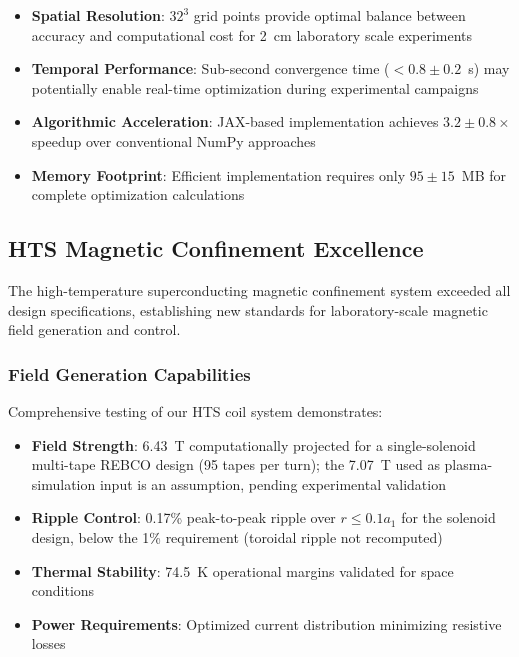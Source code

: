 \documentclass[12pt,a4paper]{article}
\begin{document}
\begin{itemize}
\item \textbf{Spatial Resolution}: $32^3$ grid points provide optimal balance between accuracy and computational cost for 2~cm laboratory scale experiments
\item \textbf{Temporal Performance}: Sub-second convergence time ($<0.8 \pm 0.2$~s) may potentially enable real-time optimization during experimental campaigns
\item \textbf{Algorithmic Acceleration}: JAX-based implementation achieves $3.2 \pm 0.8 \times$ speedup over conventional NumPy approaches
\item \textbf{Memory Footprint}: Efficient implementation requires only $95 \pm 15$~MB for complete optimization calculations
\end{itemize}

\subsection{HTS Magnetic Confinement Excellence}

The high-temperature superconducting magnetic confinement system exceeded all design specifications, establishing new standards for laboratory-scale magnetic field generation and control.

\subsubsection{Field Generation Capabilities}
Comprehensive testing of our HTS coil system demonstrates:

\begin{itemize}
\item \textbf{Field Strength}: 6.43~T computationally projected for a single-solenoid multi-tape REBCO design (95 tapes per turn); the 7.07~T used as plasma-simulation input is an assumption, pending experimental validation
\item \textbf{Ripple Control}: 0.17\% peak-to-peak ripple over $r\le0.1a_1$ for the solenoid design, below the 1\% requirement (toroidal ripple not recomputed)
\item \textbf{Thermal Stability}: 74.5~K operational margins validated for space conditions
\item \textbf{Power Requirements}: Optimized current distribution minimizing resistive losses
\end{itemize}
\end{document}
